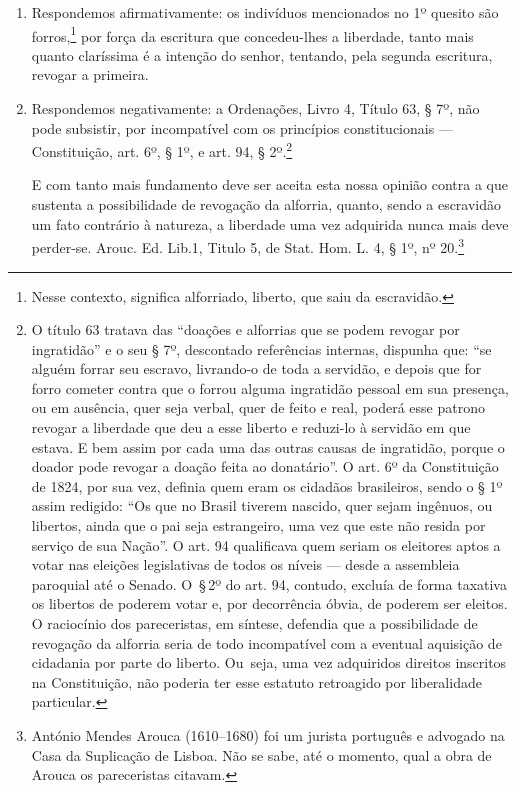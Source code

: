 \begin{enumerate}[label=Ao \arabic*º:]
\item Respondemos afirmativamente: os indivíduos mencionados no 1º
quesito são forros,\footnote{Nesse contexto, significa alforriado,
  liberto, que saiu da escravidão.} por força da escritura que
concedeu-lhes a liberdade, tanto mais quanto claríssima é a intenção do
senhor, tentando, pela segunda escritura, revogar a primeira.

\item Respondemos negativamente: a Ordenações, Livro 4,
Título 63, § 7º, não pode subsistir, por incompatível com os
princípios constitucionais --- Constituição, art. 6º, § 1º, e art.
94, § 2º.\footnote{O título 63 tratava das ``doações e alforrias que se
  podem revogar por ingratidão'' e o seu § 7º, descontado referências
  internas, dispunha que: ``se alguém forrar seu escravo, livrando-o de
  toda a servidão, e depois que for forro cometer contra que o forrou
  alguma ingratidão pessoal em sua presença, ou em ausência, quer seja
  verbal, quer de feito e real, poderá esse patrono revogar a liberdade
  que deu a esse liberto e reduzi-lo à servidão em que estava. E bem
  assim por cada uma das outras causas de ingratidão, porque o doador
  pode revogar a doação feita ao donatário''. O art. 6º da Constituição
  de 1824, por sua vez, definia quem eram os cidadãos brasileiros, sendo
  o § 1º assim redigido: ``Os que no Brasil tiverem nascido, quer sejam
  ingênuos, ou libertos, ainda que o pai seja estrangeiro, uma vez que
  este não resida por serviço de sua Nação''. O art. 94 qualificava quem
  seriam os eleitores aptos a votar nas eleições legislativas de todos
  os níveis --- desde a assembleia paroquial até o Senado. O~§\,2º do art.
  94, contudo, excluía de forma taxativa os libertos de poderem votar e,
  por decorrência óbvia, de poderem ser eleitos. O raciocínio dos
  pareceristas, em síntese, defendia que a possibilidade de revogação da
  alforria seria de todo incompatível com a eventual aquisição de
  cidadania por parte do liberto. Ou~seja, uma vez adquiridos direitos
  inscritos na Constituição, não poderia ter esse estatuto retroagido
  por liberalidade particular.}

E com tanto mais fundamento deve ser aceita esta nossa opinião contra a
que sustenta a possibilidade de revogação da alforria, quanto, sendo a
escravidão um fato contrário à natureza, a liberdade uma vez adquirida
nunca mais deve perder-se. Arouc. Ed. Lib.1, Titulo 5, de Stat.
Hom. L. 4, § 1º, nº 20.\footnote{António Mendes Arouca (1610--1680) foi
  um jurista português e advogado na Casa da Suplicação de Lisboa. Não
  se sabe, até o momento, qual a obra de Arouca os pareceristas citavam.}


\end{enumerate}
